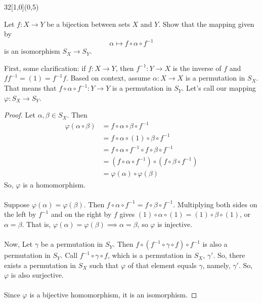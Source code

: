 \documentclass[12pt]{article}
\newenvironment{exercise}[2]{\begin{textblock}{32}[1,0](0,#2)\noindent#1\end{textblock}}{\vspace{1in}}
\begin{document}
\begin{exercise}{1.39}{5}
	{\noindent}Let $f : X\to Y$ be a bijection between sets $X$ and $Y$. Show that the mapping given by \[\alpha \mapsto f\circ\alpha\circ f^{-1}\]
	is an isomorphism $S_X\to S_Y$.
	\bigskip

	{\noindent}First, some clarification: if $f:X\to Y$, then $f^{-1}:Y\to X$ is the inverse of $f$ and $ff^{-1}=(1)=f^{-1}f$.
	Based on context, assume $\alpha:X\to X$ is a permutation in $S_X$. That means that $f\circ\alpha\circ f^{-1}:Y\to Y$ is a
	permutation in $S_Y$. Let's call our mapping $\varphi:S_X\to S_Y$.

	\begin{proof}
		Let $\alpha,\beta\in S_X$. Then
		\begin{align*}
			\varphi(\alpha\circ\beta) &= f\circ\alpha\circ\beta\circ f^{-1} \\
												&= f\circ\alpha\circ(1)\circ\beta\circ f^{-1} \\
												&= f\circ\alpha\circ f^{-1}\circ f\circ\beta\circ f^{-1} \\
												&= (f\circ\alpha\circ f^{-1})\circ(f\circ\beta\circ f^{-1}) \\
												&= \varphi(\alpha)\circ\varphi(\beta)
		\end{align*}
		So, $\varphi$ is a homomorphism.\\
		\\
		Suppose $\varphi(\alpha)=\varphi(\beta)$. Then $f\circ\alpha\circ f^{-1}=f\circ\beta\circ f^{-1}$. Multiplying both sides on
		the left by $f^{-1}$ and on the right by $f$ gives $(1)\circ\alpha\circ(1)=(1)\circ\beta\circ(1)$, or $\alpha=\beta$. That is,
		$\varphi(\alpha)=\varphi(\beta)\implies\alpha=\beta$, so $\varphi$ is injective.\\
		\\
		Now, Let $\gamma$ be a permutation in $S_Y$. Then $f\circ (f^{-1}\circ\gamma\circ f)\circ f^{-1}$ is also a permutation in $S_Y$.
		Call $f^{-1}\circ\gamma\circ f$, which is a permutation in $S_X$, $\gamma'$. So, there exists a permutation in $S_X$ such that
		$\varphi$ of that element equals $\gamma$, namely, $\gamma'$. So, $\varphi$ is also surjective.\\
		\\
		Since $\varphi$ is a bijective homomorphism, it is an isomorphism.
	\end{proof}
	\end{exercise}
\end{document}
